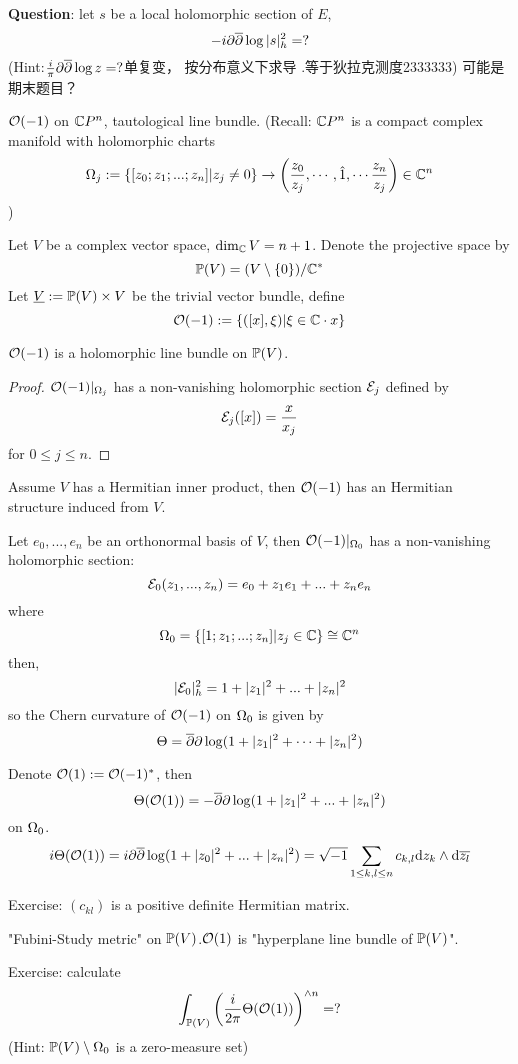 \textbf{Question}: let $s$ be a local holomorphic section of $E$,
$$-i\partial\overline{\partial}\log|s|_h^2=?$$
(Hint:$\frac{i}{\pi}\partial\overline{\partial}\log z=?$单复变，
按分布意义下求导 .等于狄拉克测度2333333)
{\color{red}可能是期末题目？}

\begin{example}
$\mathcal{O}(-1)$ on $\mathbb{C} P^n$, tautological line bundle. 
(Recall: $\mathbb{C} P^n$ is a compact complex manifold with holomorphic charts
$$\Omega_j:=\{[z_0;z_1;...;z_n]|z_j\neq 0\}\to
\left(
\frac{z_0}{z_j},\cdots,\hat{1},\cdots
\frac{z_n}{z_j}
\right)\in\mathbb{C}^n$$
)
\end{example}

Let $V$ be a complex vector space, $\dim_{\mathbb{C}} V=n+1$. 
Denote the projective space by 
$$\mathbb{P}(V)=(V\setminus\{0\})/\mathbb{C}^*$$
Let $\underline{V}:=\mathbb{P}(V)\times V$ be the trivial vector bundle,
define 
$$\mathcal{O}(-1):=\{([x],\xi)|\xi\in\mathbb{C}\cdot x\}$$

\begin{prop}
$\mathcal{O}(-1)$ is a holomorphic line bundle on $\mathbb{P}(V)$.
\end{prop}
\begin{proof}
$\mathcal{O}(-1)|_{\Omega_j}$ has a non-vanishing holomorphic section $\mathcal{E}_j$ defined by 
$$\mathcal{E}_j([x])=\frac{x}{x_j}$$
for $0\leq j\leq n$. 
\end{proof}

Assume $V$ has a Hermitian inner product, then $\mathcal{O}(-1)$ has an 
Hermitian structure induced from $V$.

Let $e_0,...,e_n$ be an orthonormal basis of $V$, then 
$\mathcal{O}(-1)|_{\Omega_0}$ has a non-vanishing holomorphic section:
$$\mathcal{E}_0(z_1,...,z_n)=e_0+z_1e_1+...+z_ne_n$$
where
$$\Omega_0=\{[1;z_1;...;z_n]|z_j\in\mathbb{C}\}\cong\mathbb{C}^n$$
then, 
$$|\mathcal{E}_0|^2_h=1+|z_1|^2+...+|z_n|^2$$
so the Chern curvature of $\mathcal{O}(-1)$ on $\Omega_0$ is given by 
$$\Theta=\overline{\partial}\partial\log(1+|z_1|^2+\cdots+|z_n|^2)$$

Denote $\mathcal{O}(1):=\mathcal{O}(-1)^*$, then 
$$\Theta(\mathcal{O}(1))=-\overline{\partial}\partial\log(1+|z_1|^2+...+|z_n|^2)$$
on $\Omega_0$.
$$i\Theta(\mathcal{O}(1))=i\partial\overline{\partial}\log(1+|z_0|^2+...+|z_n|^2)
=\sqrt{-1}\sum_{1\leq k,l\leq n}
c_{k,l}\mathrm{d} z_k\wedge\mathrm{d}\overline{z_l}$$

Exercise: $(c_{kl})$ is a positive definite Hermitian matrix.

"Fubini-Study metric" on $\mathbb{P}(V)$.$\mathcal{O}(1)$ is 
"hyperplane line bundle of $\mathbb{P}(V)$".

Exercise: calculate 
$$\int_{\mathbb{P}(V)}
    \left(
      \frac{i}{2\pi}
      \Theta(\mathcal{O}(1))
    \right)^{\wedge n}  
=?
$$
(Hint: $\mathbb{P}(V)\setminus\Omega_0$ is a zero-measure set)

